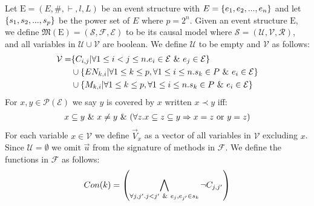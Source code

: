 Let $\mathrm{E} = (E,\#,\vdash,l,L)$ be an event structure with
$E = \{e_1, e_2, ...,e_n\}$ and let $\{s_1,s_2,...,s_p\}$ be the power set of $E$ where $p = 2^n$.
Given an event structure $\mathrm{E}$, we define
$\mathfrak{M}(\mathrm{E}) = (\mathcal{S},\mathcal{F},\mathcal{E})$
to be its causal model where 
$\mathcal{S} = (\mathcal{U},\mathcal{V},\mathcal{R})$, and all variables in
$\mathcal{U} \cup \mathcal{V}$ are boolean.
We define $\mathcal{U}$ to be empty and $\mathcal{V}$ as follows:
\begin{align*}
    \mathcal{V} = & \{C_{i,j} | \forall 1 \leq i < j \leq n. e_i \in \mathcal{E} \ \& \  e_j \in \mathcal{E}\}                    \\
                  & \cup \{EN_{k,i} | \forall 1 \leq k \leq p , \forall 1 \leq i \leq n . s_k \in P \ \& \  e_i \in \mathcal{E} \} \\
                  & \cup \{M_{k,i} | \forall 1 \leq k \leq p , \forall 1 \leq i \leq n . s_k \in P \ \& \  e_i \in \mathcal{E} \} \\
\end{align*}
For $x,y \in \mathcal{P}(\mathcal{E})$ we say $y$ is covered by $x$ written $ x \prec y$ iff:
\begin{align*}
    x \subseteq y \ \& \  x \neq y \ \& \ 
    (\forall z. x \subseteq z \subseteq y \Rightarrow x = z
    \text{ or } y = z)
\end{align*}
For each variable $x \in \mathcal{V}$ we define $\vec V_x$ as a vector
of all variables in $\mathcal{V}$ excluding $x$.
Since $\mathcal{U} = \emptyset$ we omit $\vec u$ from the
signature of methods in $\mathcal{F}$.
We define the functions in $\mathcal{F}$ as follows:
\begin{align*}
    Con(k) & =   \left(
    \bigwedge_{\forall j,j'. j<j' \ \& \  e_j,e_{j'} \in s_k}
    \neg C_{j,j'}
    \right)             \\
\end{align*}
